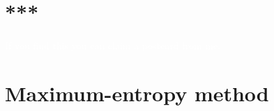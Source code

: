 \documentclass[\ifafour a4paper,12pt,\else a5paper,10pt,\fi%
onecolumn,oneside,article,%
british%
]{memoir}
\title{\propertitle}
\author{%
\hspace*{\stretch{1}}%
\parbox{0.5\linewidth}%
{\protect\centering P.G.L.  Porta Mana\\%
\footnotesize\epost{\email{piero.mana}{ntnu.no}}}%
\hspace*{\stretch{1}}%
}
\date{Draft of \today\ (first drafted \firstdraft)}
\theoremstyle{remark}
\theoremstyle{innote}
\newcommand*{\amp}{\&}
\newcommand*{\asudedication}[1]{%
{\par\centering\textit{#1}\par}}
\renewcommand*{\|}{\nonscript\,\vert\nonscript\;\mathopen{}}
\begin{document}
\captiondelim{\quad}\captionnamefont{\footnotesize}\captiontitlefont{\footnotesize}
\frenchspacing
\maketitle

\abstractrunin
\abslabeldelim{}
\renewcommand*{\abstractname}{}
\setlength{\absleftindent}{0pt}
\setlength{\absrightindent}{0pt}
\setlength{\abstitleskip}{-\absparindent}
\begin{abstract}%
  \noindent ***
\\\noindent\emph{\footnotesize Note: Dear Reader
    \amp\ Peer, this manuscript is being peer-reviewed by you. Thank you.}
\end{abstract}
\frenchspacing





\section{***}
\label{sec:***}

\textcolor{white}{If you find this you can claim a postcard from me.}


\section{Maximum-entropy method}
\label{sec:maxent_remarks}
\end{document}
